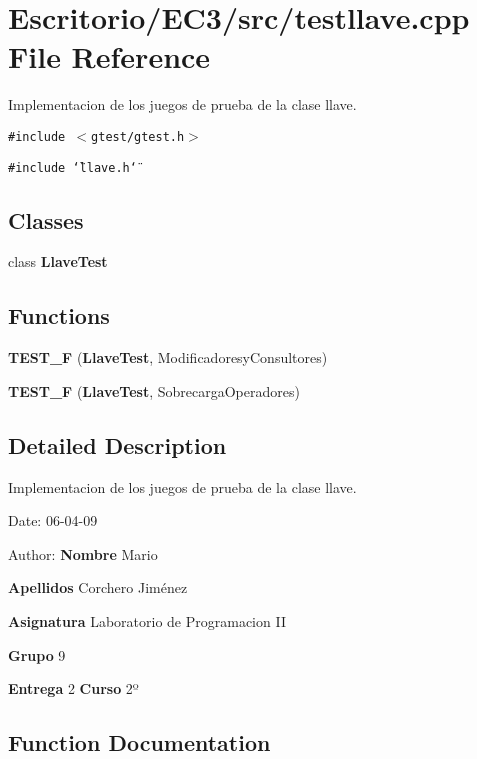 \section{Escritorio/EC3/src/testllave.cpp File Reference}
\label{testllave_8cpp}
Implementacion de los juegos de prueba de la clase llave. 

{\tt \#include $<$gtest/gtest.h$>$}\par
{\tt \#include \char`\"{}llave.h\char`\"{}}\par
\subsection*{Classes}
\begin{CompactItemize}
\item 
class {\bf LlaveTest}
\end{CompactItemize}
\subsection*{Functions}
\begin{CompactItemize}
\item 
{\bf TEST\_\-F} ({\bf LlaveTest}, ModificadoresyConsultores)
\item 
{\bf TEST\_\-F} ({\bf LlaveTest}, SobrecargaOperadores)
\end{CompactItemize}


\subsection{Detailed Description}
Implementacion de los juegos de prueba de la clase llave. 

\begin{Desc}
\item[Date:]06-04-09 \end{Desc}
\begin{Desc}
\item[Author:]{\bf Nombre} Mario \par
 {\bf Apellidos} Corchero Jiménez \par
 {\bf Asignatura} Laboratorio de Programacion II \par
 {\bf Grupo} 9 \par
 {\bf Entrega} 2 {\bf Curso} 2º \end{Desc}


\subsection{Function Documentation}
